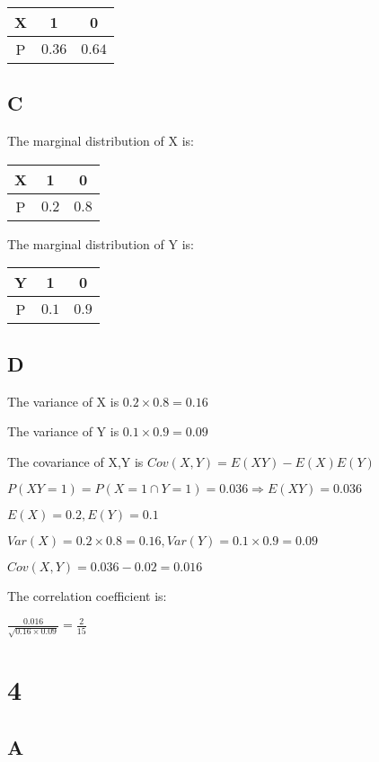 \documentclass{article}
\begin{document}
	\begin{tabular}{c|c|c}
   X & 1 & 0 \\
  	\hline
  	P & $0.36$ & $0.64$ \\
  	
  		\end{tabular}
	
	\subsection*{C}
	
	The marginal distribution of X is:
	
	\begin{tabular}{c|c|c}
   X & 1 & 0 \\
  	\hline
  	P & $0.2$ & $0.8$ \\
  	
  		\end{tabular}

	The marginal distribution of Y is:
	
	\begin{tabular}{c|c|c}
   Y & 1 & 0 \\
  	\hline
  	P & $0.1$ & $0.9$ \\
  	
  		\end{tabular}

	\subsection*{D}
	
	The variance of X is $0.2\times 0.8=0.16$
	
	The variance of Y is $0.1\times 0.9=0.09$
	
	The covariance of X,Y is $Cov(X,Y)=E(XY)-E(X)E(Y)$
	
	$P(XY=1)=P(X=1\cap Y=1)=0.036\Rightarrow E(XY)=0.036$
	
	$E(X)=0.2,E(Y)=0.1$
	
	$Var(X)=0.2\times 0.8=0.16,Var(Y)=0.1\times 0.9=0.09$
	
	$Cov(X,Y)=0.036-0.02=0.016$
	
	The correlation coefficient is:
	
	$\frac{0.016}{\sqrt{0.16\times 0.09}}=\frac{2}{15}$
	
	\section*{4}
	
	\subsection*{A}
	
\end{document}
